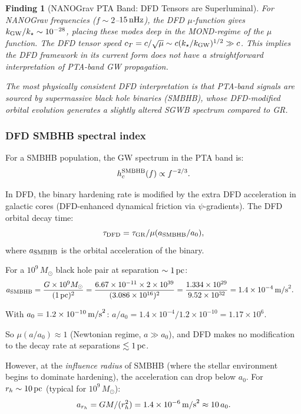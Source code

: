 \documentclass[11pt]{article}
\newtheorem{finding}{Finding}
\newcommand{\ee}[1]{\times 10^{#1}}
\newcommand{\mufd}{\mu}
\begin{document}
\begin{finding}[NANOGrav PTA Band: DFD Tensors are Superluminal]
\label{find:pta-superluminal}
For NANOGrav frequencies ($f \sim 2$--$15\,{\rm nHz}$), the DFD
$\mu$-function gives $k_{\rm GW}/k_\star \sim 10^{-28}$, placing these
modes deep in the MOND-regime of the $\mufd$ function.  The DFD tensor
speed $c_T = c/\sqrt{\mufd} \sim c(k_\star/k_{\rm GW})^{1/2} \gg c$.
This implies the DFD framework in its current form does not have a
straightforward interpretation of PTA-band GW propagation.

The most physically consistent DFD interpretation is that PTA-band
signals are sourced by \emph{supermassive black hole binaries} (SMBHB),
whose DFD-modified orbital evolution generates a slightly altered
SGWB spectrum compared to GR.
\end{finding}

\subsubsection{DFD SMBHB spectral index}

For a SMBHB population, the GW spectrum in the PTA band is:
\begin{equation}
  h_c^{\rm SMBHB}(f) \propto f^{-2/3}.
\end{equation}

In DFD, the binary hardening rate is modified by the extra DFD
acceleration in galactic cores (DFD-enhanced dynamical friction via
$\psi$-gradients).  The DFD orbital decay time:
\begin{equation}
  \tau_{\rm DFD} = \tau_{\rm GR}/\mufd(a_{\rm SMBHB}/a_0),
\end{equation}
where $a_{\rm SMBHB}$ is the orbital acceleration of the binary.

For a $10^9\,M_\odot$ black hole pair at separation $\sim 1\,{\rm pc}$:
\begin{align}
  a_{\rm SMBHB} &= \frac{G\times 10^9 M_\odot}{(1\,{\rm pc})^2}
  = \frac{6.67\ee{-11}\times 2\ee{39}}{(3.086\ee{16})^2}
  = \frac{1.334\ee{29}}{9.52\ee{32}} = 1.4\ee{-4}\,{\rm m/s}^2.
\end{align}

With $a_0 = 1.2\ee{-10}\,{\rm m/s}^2$: $a/a_0 = 1.4\ee{-4}/1.2\ee{-10} = 1.17\ee{6}$.

So $\mufd(a/a_0) \approx 1$ (Newtonian regime, $a \gg a_0$), and DFD makes
no modification to the decay rate at separations $\lesssim 1\,{\rm pc}$.

However, at the \emph{influence radius} of SMBHB (where the stellar
environment begins to dominate hardening), the acceleration can drop
below $a_0$.  For $r_h \sim 10\,{\rm pc}$ (typical for $10^9\,M_\odot$):
\begin{equation}
  a_{r_h} = G M/(r_h^2) = 1.4\ee{-6}\,{\rm m/s}^2 \approx 10\,a_0.
\end{equation}
\end{document}
